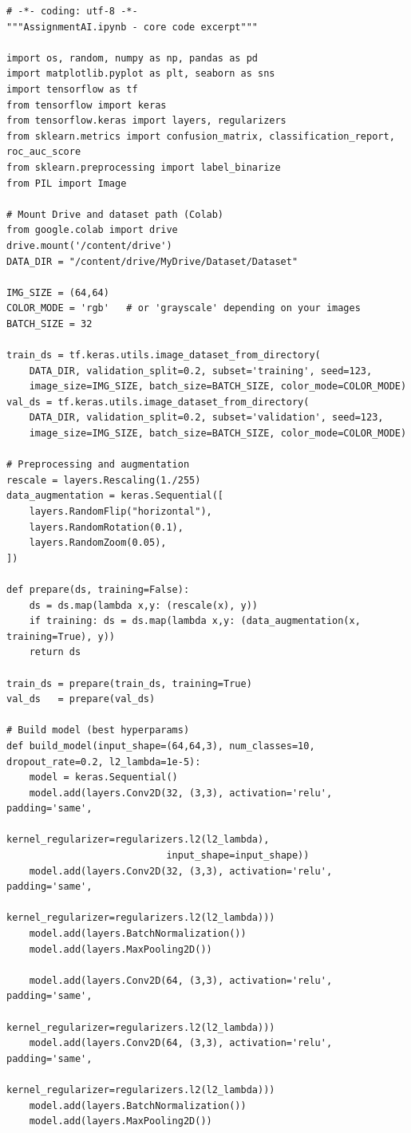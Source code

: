 \documentclass[conference]{IEEEtran}
\begin{document}
\begin{lstlisting}[caption={Core training & evaluation script (Python)}]
# -*- coding: utf-8 -*-
"""AssignmentAI.ipynb - core code excerpt"""

import os, random, numpy as np, pandas as pd
import matplotlib.pyplot as plt, seaborn as sns
import tensorflow as tf
from tensorflow import keras
from tensorflow.keras import layers, regularizers
from sklearn.metrics import confusion_matrix, classification_report, roc_auc_score
from sklearn.preprocessing import label_binarize
from PIL import Image

# Mount Drive and dataset path (Colab)
from google.colab import drive
drive.mount('/content/drive')
DATA_DIR = "/content/drive/MyDrive/Dataset/Dataset"

IMG_SIZE = (64,64)
COLOR_MODE = 'rgb'   # or 'grayscale' depending on your images
BATCH_SIZE = 32

train_ds = tf.keras.utils.image_dataset_from_directory(
    DATA_DIR, validation_split=0.2, subset='training', seed=123,
    image_size=IMG_SIZE, batch_size=BATCH_SIZE, color_mode=COLOR_MODE)
val_ds = tf.keras.utils.image_dataset_from_directory(
    DATA_DIR, validation_split=0.2, subset='validation', seed=123,
    image_size=IMG_SIZE, batch_size=BATCH_SIZE, color_mode=COLOR_MODE)

# Preprocessing and augmentation
rescale = layers.Rescaling(1./255)
data_augmentation = keras.Sequential([
    layers.RandomFlip("horizontal"),
    layers.RandomRotation(0.1),
    layers.RandomZoom(0.05),
])

def prepare(ds, training=False):
    ds = ds.map(lambda x,y: (rescale(x), y))
    if training: ds = ds.map(lambda x,y: (data_augmentation(x, training=True), y))
    return ds

train_ds = prepare(train_ds, training=True)
val_ds   = prepare(val_ds)

# Build model (best hyperparams)
def build_model(input_shape=(64,64,3), num_classes=10, dropout_rate=0.2, l2_lambda=1e-5):
    model = keras.Sequential()
    model.add(layers.Conv2D(32, (3,3), activation='relu', padding='same',
                            kernel_regularizer=regularizers.l2(l2_lambda),
                            input_shape=input_shape))
    model.add(layers.Conv2D(32, (3,3), activation='relu', padding='same',
                            kernel_regularizer=regularizers.l2(l2_lambda)))
    model.add(layers.BatchNormalization())
    model.add(layers.MaxPooling2D())

    model.add(layers.Conv2D(64, (3,3), activation='relu', padding='same',
                            kernel_regularizer=regularizers.l2(l2_lambda)))
    model.add(layers.Conv2D(64, (3,3), activation='relu', padding='same',
                            kernel_regularizer=regularizers.l2(l2_lambda)))
    model.add(layers.BatchNormalization())
    model.add(layers.MaxPooling2D())


\end{lstlisting}
\end{document}

